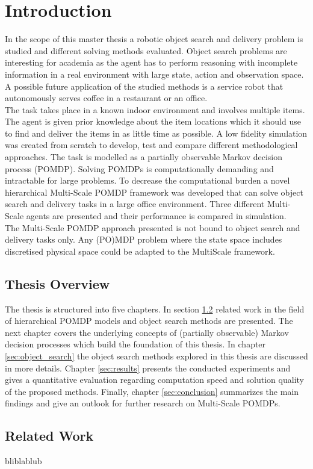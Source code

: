 \chapter{Introduction}
\label{sec:introduction}

In the scope of this master thesis a robotic object search and delivery problem is studied and different solving methods evaluated. Object search problems are interesting for academia as the agent has to perform reasoning with incomplete information in a real environment with large state, action and observation space. A possible future application of the studied methods is a service robot that autonomously serves coffee in a restaurant or an office.  \\

The task takes place in a known indoor environment and involves multiple items. The agent is given prior knowledge about the item locations which it should use to find and deliver the items in as little time as possible. A low fidelity simulation was created from scratch to develop, test and compare different methodological approaches. The task is modelled as a partially observable Markov decision process (POMDP). Solving POMDPs is computationally demanding and intractable for large problems. To decrease the computational burden a novel hierarchical Multi-Scale POMDP framework was developed that can solve object search and delivery tasks in a large office environment. Three different Multi-Scale agents are presented and their performance is compared in simulation.\\

The Multi-Scale POMDP approach presented is not bound to object search and delivery tasks only. Any (PO)MDP problem where the state space includes discretised physical space could be adapted to the MultiScale framework. 



\section{Thesis Overview}
The thesis is structured into five chapters. In section \ref{sec:relatedwork} related work in the field of hierarchical POMDP models and object search methods are presented. The next chapter covers the underlying concepts of (partially observable) Markov decision processes which build the foundation of this thesis. In chapter \ref{sec:object_search} the object search methods explored in this thesis are discussed in more details. Chapter \ref{sec:results} presents the conducted experiments and gives a quantitative evaluation regarding computation speed and solution quality of the proposed methods. Finally, chapter \ref{sec:conclusion} summarizes the main findings and give an outlook for further research on Multi-Scale POMDPs. 


\section{Related Work}\label{sec:relatedwork}
bliblablub